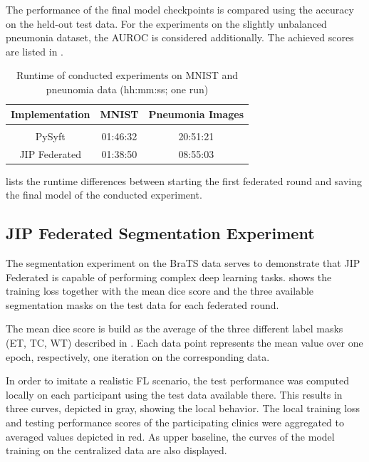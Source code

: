 The performance of the final model checkpoints is compared using the accuracy on the held-out test data. 
For the experiments on the slightly unbalanced pneumonia dataset, the AUROC is considered additionally. The achieved scores are listed in .

\begin{table}[htbp]
  \centering
  \begin{tabular}{ccc}
  Implementation & MNIST & Pneumonia Images \\
  \hline \\[-2.5ex] %
  PySyft        & 01:46:32 & 20:51:21 \\
  JIP Federated & 01:38:50 & 08:55:03 \\
 \end{tabular}
 \caption[Runtime of conducted experiments on MNIST and pneunomia data]{Runtime of conducted experiments on MNIST and pneunomia data (hh:mm:ss; one run)}
 \label{tab:RuntimeExp}
\end{table}

 lists the runtime differences between starting the first federated round and saving the final model of the conducted experiment.




\subsection{JIP Federated Segmentation Experiment}
\label{subsec:ResultsSegmentation}

The segmentation experiment on the BraTS data serves to demonstrate that JIP Federated is capable of performing complex deep learning tasks.
 shows the training loss together with the mean dice score and the three available segmentation masks on the test data for each federated round.

The mean dice score is build as the average of the three different label masks (ET, TC, WT) described in . 
Each data point represents the mean value over one epoch, respectively, one iteration on the corresponding data.

In order to imitate a realistic FL scenario, the test performance was computed locally on each participant using the test data available there. This results in three curves, depicted in gray, showing the local behavior. The local training loss and testing performance scores of the participating clinics were aggregated to averaged values depicted in red.
As upper baseline, the curves of the model training on the centralized data are also displayed.

